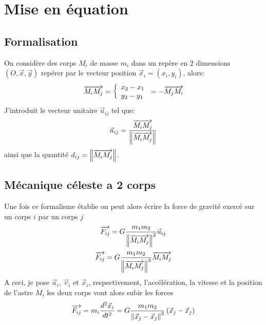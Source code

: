 \chapter*{Mise en équation}
\section*{Formalisation}
On considère des corps $M_i$ de masse $m_i$ dans un repère en 2 dimensions $(O,\vec x,\vec y)$ repérer par le vecteur position $\vec x_i = (x_i,y_i)$, alors:
\begin{equation}
    \overrightarrow{M_i M_j} = \left\{ \begin{array}{l}  x_2 - x_1 \\ y_2 - y_1 \end{array} \right.  = - \overrightarrow{M_j M_i}
\end{equation}
J'introduit le vecteur unitaire $\vec u_{ij}$ tel que:
\begin{equation}
    \vec u_{ij} = \dfrac{\overrightarrow{M_i M_j}}{\left\Vert \overrightarrow{M_i M_j} \right\Vert}
\end{equation}
ainsi que la quantité $d_{ij} = \left\Vert \overrightarrow{M_i M_j} \right\Vert$.

\section*{Mécanique céleste a 2 corps}
Une fois ce formalisme établie on peut alors écrire la force de gravité exercé sur un corps $i$ par un corps $j$
\begin{equation}
    \overrightarrow{F_{ij}} = G \dfrac{m_1 m_2}{\left\Vert \overrightarrow{M_i M_j} \right\Vert^2} \vec u_{ij}
\end{equation}
\begin{equation}
    \overrightarrow{F_{ij}} = G \dfrac{m_1 m_2}{\left\Vert \overrightarrow{M_i M_j} \right\Vert^3} \overrightarrow{M_i M_j}
\end{equation}
A ceci, je pose $\vec a_i$, $\vec v_i$ et $\vec x_i$, respectivement, l'accélération, la vitesse et la position de l'astre $M_i$ les deux corps vont alors subir les forces 
\begin{equation}
    \overrightarrow{F_{ij}} = m_i \dfrac{d^2 \vec x_i}{dt^2} = G \dfrac{m_1 m_2}{\left\Vert \vec x_j - \vec x_j \right\Vert^3} \left( \vec x_j - \vec x_j \right)
\end{equation}